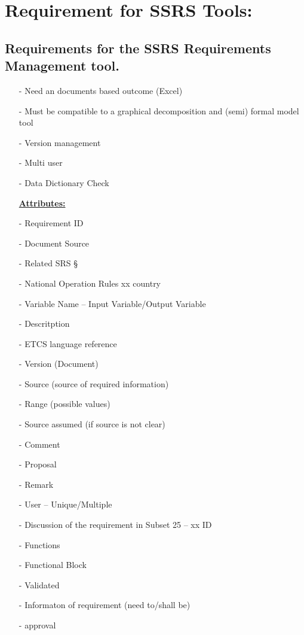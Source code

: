\documentclass{template/openetcs_article}
\begin{document}
 \section{Requirement for SSRS Tools:}
 \subsection{Requirements for the SSRS Requirements Management tool.}
\begin{itemize}
  \item[-] Need an documents based outcome (Excel)
  \item[-] Must be compatible to a graphical decomposition and (semi) formal model tool
  \item[-] Version management
  \item[-] Multi user
  \item[-] Data Dictionary Check
\end{itemize}
\begin{itemize}
  \item[ ]\textbf{\underline{Attributes:}}
  \item[-]Requirement ID
  \item[-]Document Source
  \item[-]Related SRS §
  \item[-]National Operation Rules xx country
  \item[-]Variable Name – Input Variable/Output Variable
  \item[-]Descritption
  \item[-]ETCS language reference
  \item[-]Version (Document)
  \item[-]Source (source of required information)
  \item[-]Range (possible values)
  \item[-]Source assumed (if source is not clear)
  \item[-]Comment
  \item[-]Proposal
  \item[-]Remark
  \item[-]User – Unique/Multiple
  \item[-]Discussion of the requirement in Subset 25 – xx ID
  \item[-]Functions
  \item[-]Functional Block
  \item[-]Validated
  \item[-]Informaton of requirement (need to/shall be)
  \item[-]approval
\end{itemize}
\end{document}
